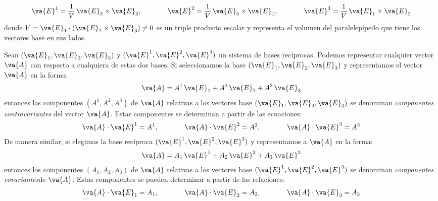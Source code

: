 \begin{align*}
\va{E}^{1} = \dfrac{1}{V} \, \va{E}_{2} \times \va{E}_{3}, \hspace{1.3cm} \va{E}^{2} = \dfrac{1}{V} \, \va{E}_{3} \times \va{E}_{1}, \hspace{1.3cm} \va{E}^{3} = \dfrac{1}{V} \, \va{E}_{1} \times \va{E}_{2}
\end{align*}
donde $V = \va{E}_{1} \cdot (\va{E}_{2} \times \va{E}_{3}) \neq 0$ es un triple producto escalar y representa el volumen del paralelepípedo que tiene los vectores base en sus lados.
\par
Sean $(\va{E}_{1}, \va{E}_{2}, \va{E}_{3})$ y $(\va{E}^{1}, \va{E}^{2}, \va{E}^{3})$ un sistema de bases recíprocas. Podemos representar cualquier vector $\va{A}$ con respecto a cualquiera de estas dos bases. Si seleccionamos la base $(\va{E}_{1}, \va{E}_{2}, \va{E}_{3})$ y representamos el vector $\va{A}$ en la forma:
\begin{align}
\va{A} = A^{1} \, \va{E}_{1} + A^{2} \, \va{E}_{2} + A^{3} \, \va{E}_{3}
\label{ec:ecuacion_02_01}
\end{align}
entonces las componentes $(A^{1}, A^{2}, A^{3})$ de $\va{A}$ relativas a los vectores base $(\va{E}_{1}, \va{E}_{2}, \va{E}_{3})$ se denominan \emph{
componentes contravariantes} del vector $\va{A}$. Estas componentes se determinan a partir de las ecuaciones:
\begin{align*}
\va{A} \cdot \va{E}^{1} = A^{1}, \hspace{1.3cm} \va{A} \cdot \va{E}^{2} = A^{2}, \hspace{1.3cm} \va{A} \cdot \va{E}^{3} = A^{3}
\end{align*}
De manera similar, si elegimos la base recíproca $(\va{E}^{1}, \va{E}^{2}, \va{E}^{3})$ y representamos a $\va{A}$ en la forma:
\begin{align}
\va{A} = A_{1} \, \va{E}^{1} + A_{2} \, \va{E}^{2} + A_{3} \, \va{E}^{3}
\label{ec:ecuacion_02_02}
\end{align}
entonces los componentes $(A_{1}, A_{2}, A_{3})$ de $\va{A}$ relativas a los vectores base $(\va{E}^{1}, \va{E}^{2}, \va{E}^{3})$ se denominan \emph{componentes covariantes}de $\va{A}$. Estas componentes se pueden determinar a partir de las relaciones:
\begin{align*}
\va{A} \cdot \va{E}_{1} = A_{1}, \hspace{1.3cm} \va{A} \cdot \va{E}_{2} = A_{2}, \hspace{1.3cm} \va{A} \cdot \va{E}_{3} = A_{3}
\end{align*}    

